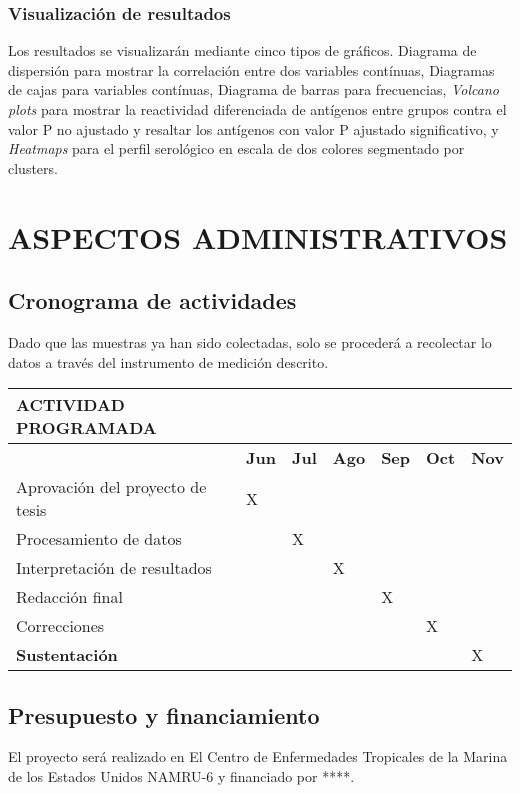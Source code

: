 \documentclass[]{article}
\begin{document}
\subsubsection{Visualización de
resultados}\label{visualizacion-de-resultados}

Los resultados se visualizarán mediante cinco tipos de gráficos.
Diagrama de dispersión para mostrar la correlación entre dos variables
contínuas, Diagramas de cajas para variables contínuas, Diagrama de
barras para frecuencias, \emph{Volcano plots} para mostrar la
reactividad diferenciada de antígenos entre grupos contra el valor P no
ajustado y resaltar los antígenos con valor P ajustado significativo, y
\emph{Heatmaps} para el perfil serológico en escala de dos colores
segmentado por clusters.

\section{ASPECTOS ADMINISTRATIVOS}\label{aspectos-administrativos}

\subsection{Cronograma de actividades}\label{cronograma-de-actividades}

Dado que las muestras ya han sido colectadas, solo se procederá a
recolectar lo datos a través del instrumento de medición descrito.

\begin{longtable}[]{@{}lllllll@{}}
\toprule
\textbf{ACTIVIDAD PROGRAMADA} & & & & & &\tabularnewline
\midrule
\endhead
& \textbf{Jun} & \textbf{Jul} & \textbf{Ago} & \textbf{Sep} &
\textbf{Oct} & \textbf{Nov}\tabularnewline
Aprovación del proyecto de tesis & X & & & & &\tabularnewline
Procesamiento de datos & & X & & & &\tabularnewline
Interpretación de resultados & & & X & & &\tabularnewline
Redacción final & & & & X & &\tabularnewline
Correcciones & & & & & X &\tabularnewline
\textbf{Sustentación} & & & & & & X\tabularnewline
\bottomrule
\end{longtable}

\subsection{Presupuesto y
financiamiento}\label{presupuesto-y-financiamiento}

El proyecto será realizado en El Centro de Enfermedades Tropicales de la
Marina de los Estados Unidos NAMRU-6 y financiado por ****.
\end{document}
